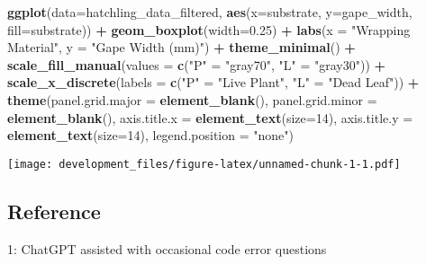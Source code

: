 \documentclass[
]{article}
\newenvironment{Shaded}{\begin{snugshade}}{\end{snugshade}}
\newcommand{\AttributeTok}[1]{\textcolor[rgb]{0.13,0.29,0.53}{#1}}
\newcommand{\DecValTok}[1]{\textcolor[rgb]{0.00,0.00,0.81}{#1}}
\newcommand{\FloatTok}[1]{\textcolor[rgb]{0.00,0.00,0.81}{#1}}
\newcommand{\FunctionTok}[1]{\textcolor[rgb]{0.13,0.29,0.53}{\textbf{#1}}}
\newcommand{\NormalTok}[1]{#1}
\newcommand{\OtherTok}[1]{\textcolor[rgb]{0.56,0.35,0.01}{#1}}
\newcommand{\SpecialCharTok}[1]{\textcolor[rgb]{0.81,0.36,0.00}{\textbf{#1}}}
\newcommand{\StringTok}[1]{\textcolor[rgb]{0.31,0.60,0.02}{#1}}
\begin{document}
\begin{Shaded}
\begin{Highlighting}[]
\FunctionTok{ggplot}\NormalTok{(}\AttributeTok{data=}\NormalTok{hatchling\_data\_filtered, }\FunctionTok{aes}\NormalTok{(}\AttributeTok{x=}\NormalTok{substrate, }\AttributeTok{y=}\NormalTok{gape\_width, }\AttributeTok{fill=}\NormalTok{substrate)) }\SpecialCharTok{+}
  \FunctionTok{geom\_boxplot}\NormalTok{(}\AttributeTok{width=}\FloatTok{0.25}\NormalTok{) }\SpecialCharTok{+}
  \FunctionTok{labs}\NormalTok{(}\AttributeTok{x =} \StringTok{"Wrapping Material"}\NormalTok{, }\AttributeTok{y =} \StringTok{"Gape Width (mm)"}\NormalTok{) }\SpecialCharTok{+}
  \FunctionTok{theme\_minimal}\NormalTok{() }\SpecialCharTok{+}
  \FunctionTok{scale\_fill\_manual}\NormalTok{(}\AttributeTok{values =} \FunctionTok{c}\NormalTok{(}\StringTok{"P"} \OtherTok{=} \StringTok{"gray70"}\NormalTok{, }\StringTok{"L"} \OtherTok{=} \StringTok{"gray30"}\NormalTok{)) }\SpecialCharTok{+} 
  \FunctionTok{scale\_x\_discrete}\NormalTok{(}\AttributeTok{labels =} \FunctionTok{c}\NormalTok{(}\StringTok{"P"} \OtherTok{=} \StringTok{"Live Plant"}\NormalTok{, }\StringTok{"L"} \OtherTok{=} \StringTok{"Dead Leaf"}\NormalTok{)) }\SpecialCharTok{+}
  \FunctionTok{theme}\NormalTok{(}\AttributeTok{panel.grid.major =} \FunctionTok{element\_blank}\NormalTok{(),}
        \AttributeTok{panel.grid.minor =} \FunctionTok{element\_blank}\NormalTok{(),}
        \AttributeTok{axis.title.x =} \FunctionTok{element\_text}\NormalTok{(}\AttributeTok{size=}\DecValTok{14}\NormalTok{),}
        \AttributeTok{axis.title.y =} \FunctionTok{element\_text}\NormalTok{(}\AttributeTok{size=}\DecValTok{14}\NormalTok{),}
        \AttributeTok{legend.position =} \StringTok{"none"}\NormalTok{)}
\end{Highlighting}
\end{Shaded}

\texttt{[image: development\_files/figure-latex/unnamed-chunk-1-1.pdf]}

\subsection{Reference}\label{reference}

1: ChatGPT assisted with occasional code error questions
\end{document}
